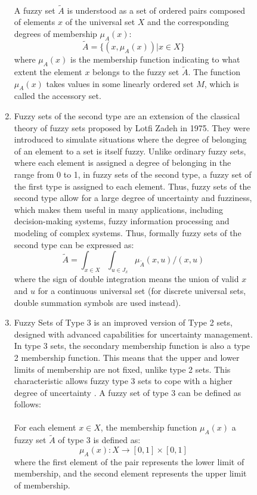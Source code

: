 \documentclass{article}
\begin{document}
\begin{figure}[!t]
\begin{minipage}{0.49\textwidth}
\begin{enumerate}
                ~\\
                A fuzzy set $\tilde{A}$ is understood as a set of ordered pairs composed of elements $x$ of the universal set $X$ and the corresponding degrees of membership $\mu_A(x)$:\\
                $$\tilde{A}=\{(x, \mu_A(x)) | x \in X\}$$
                where $\mu_A(x)$ is the membership function indicating to what extent the element $x$ belongs to the fuzzy set $\tilde{A}$. The function $\mu_A(x)$ takes values in some linearly ordered set $M$, which is called the accessory set.
                \item Fuzzy sets of the second type are an extension of the classical theory of fuzzy sets proposed by Lotfi Zadeh in 1975. They were introduced to simulate situations where the degree of belonging of an element to a set is itself fuzzy. Unlike ordinary fuzzy sets, where each element is assigned a degree of belonging in the range from 0 to 1, in fuzzy sets of the second type, a fuzzy set of the first type is assigned to each element. Thus, fuzzy sets of the second type allow for a large degree of uncertainty and fuzziness, which makes them useful in many applications, including decision-making systems, fuzzy information processing and modeling of complex systems. Thus, formally fuzzy sets of the second type can be expressed as:
                $$\tilde{A}=\int_{x\in X}\int_{u\in J_{x}} \mu_{\tilde{A}}(x,u) / (x,u)$$
                where the sign of double integration means the union of valid $x$ and $u$ for a continuous universal set (for discrete universal sets, double summation symbols are used instead).
                \item Fuzzy Sets of Type 3 is an improved version of Type 2 sets, designed with advanced capabilities for uncertainty management. In type 3 sets, the secondary membership function is also a type 2 membership function. This means that the upper and lower limits of membership are not fixed, unlike type 2 sets. This characteristic allows fuzzy type 3 sets to cope with a higher degree of uncertainty \cite{litlink22}. A fuzzy set of type 3 can be defined as follows:\\
                ~\\
                For each element \(x \in X\), the membership function \(\mu_{A}(x)\) a fuzzy set \(\tilde{A}\) of type 3 is defined as:\\
                \[\mu_{A}(x) : X \rightarrow [0,1] \times [0,1]\]
                where the first element of the pair represents the lower limit of membership, and the second element represents the upper limit of membership.\\

\end{enumerate}
\end{minipage}
\end{figure}
\end{document}
